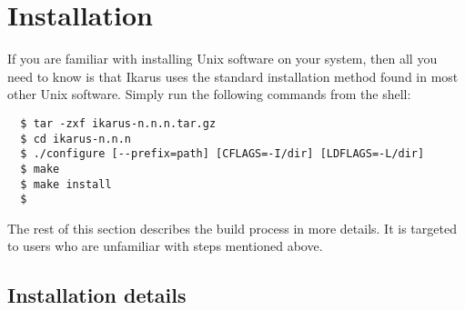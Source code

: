 \documentclass[onecolumn, 12pt, twoside, openright, dvipdfm]{book}
\begin{document}
\section{Installation}

If you are familiar with installing Unix software on your system,
then all you need to know is that Ikarus uses the standard
installation method found in most other Unix software.  Simply run
the following commands from the shell:
\begin{verbatim}
  $ tar -zxf ikarus-n.n.n.tar.gz
  $ cd ikarus-n.n.n
  $ ./configure [--prefix=path] [CFLAGS=-I/dir] [LDFLAGS=-L/dir]
  $ make
  $ make install
  $
\end{verbatim}

The rest of this section describes the build process in more
details.  It is targeted to users who are unfamiliar with steps
mentioned above.

\subsection{Installation details}
\end{document}
